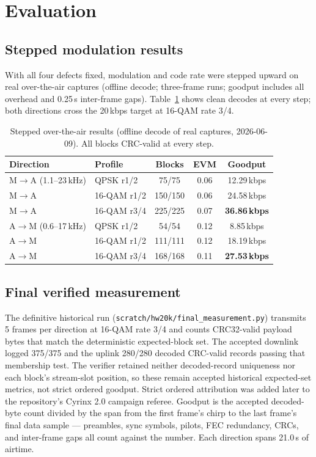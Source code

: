 \documentclass[11pt]{article}
\begin{document}
\section{Evaluation}
\label{sec:eval}

\subsection{Stepped modulation results}

With all four defects fixed, modulation and code rate were stepped upward on
real over-the-air captures (offline decode; three-frame runs; goodput includes
all overhead and 0.25\,s inter-frame gaps). Table~\ref{tab:steps} shows clean
decodes at every step; both directions cross the 20\,kbps target at 16-QAM
rate 3/4.

\begin{table}[t]
\centering
\caption{Stepped over-the-air results (offline decode of real captures,
2026-06-09). All blocks CRC-valid at every step.}
\label{tab:steps}
\begin{tabular}{llccc}
\toprule
Direction & Profile & Blocks & EVM & Goodput \\
\midrule
M$\rightarrow$A (1.1--23\,kHz) & QPSK r1/2  & 75/75   & 0.06 & 12.29\,kbps \\
M$\rightarrow$A & 16-QAM r1/2 & 150/150 & 0.06 & 24.58\,kbps \\
M$\rightarrow$A & 16-QAM r3/4 & 225/225 & 0.07 & \textbf{36.86\,kbps} \\
\midrule
A$\rightarrow$M (0.6--17\,kHz) & QPSK r1/2  & 54/54   & 0.12 & \phantom{0}8.85\,kbps \\
A$\rightarrow$M & 16-QAM r1/2 & 111/111 & 0.12 & 18.19\,kbps \\
A$\rightarrow$M & 16-QAM r3/4 & 168/168 & 0.11 & \textbf{27.53\,kbps} \\
\bottomrule
\end{tabular}
\end{table}

\subsection{Final verified measurement}

The definitive historical run (\texttt{scratch/hw20k/final\_measurement.py}) transmits
5 frames per direction at 16-QAM rate 3/4 and counts CRC32-valid payload bytes
that match the deterministic expected-block set. The accepted downlink logged
375/375 and the uplink 280/280 decoded CRC-valid records passing that membership
test. The verifier retained neither decoded-record uniqueness nor each block's
stream-slot position, so these remain accepted historical expected-set metrics,
not strict ordered goodput. Strict ordered attribution was added later to the
repository's Cyrinx 2.0 campaign referee. Goodput is the accepted decoded-byte
count divided by the span from the first
frame's chirp to the
last frame's final data sample --- preambles, sync symbols, pilots, FEC
redundancy, CRCs, and inter-frame gaps all count against the number. Each
direction spans 21.0\,s of airtime.
\end{document}
